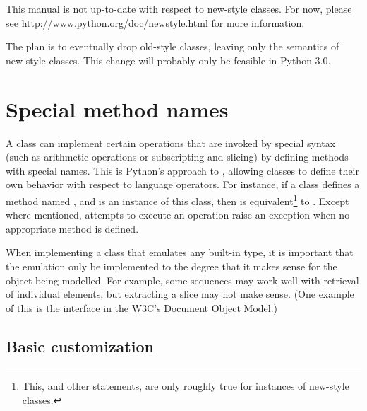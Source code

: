 This manual is not up-to-date with respect to new-style classes.  For now,
please see \url{http://www.python.org/doc/newstyle.html} for more information.

The plan is to eventually drop old-style classes, leaving only the semantics of
new-style classes.  This change will probably only be feasible in Python 3.0.

\section{Special method names\label{specialnames}}

A class can implement certain operations that are invoked by special
syntax (such as arithmetic operations or subscripting and slicing) by
defining methods with special names.
This is Python's approach to , allowing
classes to define their own behavior with respect to language
operators.  For instance, if a class defines
a method named , and  is an instance of
this class, then  is equivalent\footnote{This, and other
statements, are only roughly true for instances of new-style
classes.} to
.  Except where mentioned, attempts to execute
an operation raise an exception when no appropriate method is defined.

When implementing a class that emulates any built-in type, it is
important that the emulation only be implemented to the degree that it
makes sense for the object being modelled.  For example, some
sequences may work well with retrieval of individual elements, but
extracting a slice may not make sense.  (One example of this is the
 interface in the W3C's Document Object Model.)


\subsection{Basic customization\label{customization}}

